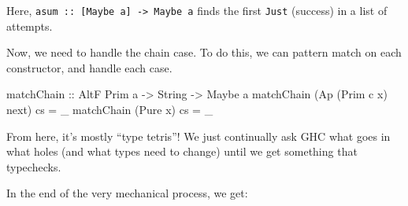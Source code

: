 \documentclass[]{article}
\newenvironment{Shaded}{}{}
\newcommand{\CommentTok}[1]{\textcolor[rgb]{0.38,0.63,0.69}{\textit{#1}}}
\newcommand{\DataTypeTok}[1]{\textcolor[rgb]{0.56,0.13,0.00}{#1}}
\newcommand{\FunctionTok}[1]{\textcolor[rgb]{0.02,0.16,0.49}{#1}}
\newcommand{\KeywordTok}[1]{\textcolor[rgb]{0.00,0.44,0.13}{\textbf{#1}}}
\newcommand{\NormalTok}[1]{#1}
\newcommand{\OtherTok}[1]{\textcolor[rgb]{0.00,0.44,0.13}{#1}}
\begin{document}
Here, \texttt{asum\ ::\ {[}Maybe\ a{]}\ -\textgreater{}\ Maybe\ a} finds the
first \texttt{Just} (success) in a list of attempts.

Now, we need to handle the chain case. To do this, we can pattern match on each
constructor, and handle each case.

\begin{Shaded}
\begin{Highlighting}[]
\OtherTok{matchChain ::} \DataTypeTok{AltF} \DataTypeTok{Prim}\NormalTok{ a }\OtherTok{->} \DataTypeTok{String} \OtherTok{->} \DataTypeTok{Maybe}\NormalTok{ a}
\NormalTok{matchChain (}\DataTypeTok{Ap}\NormalTok{ (}\DataTypeTok{Prim}\NormalTok{ c x) next) cs }\FunctionTok{=}\NormalTok{ _}
\NormalTok{matchChain (}\DataTypeTok{Pure}\NormalTok{ x)             cs }\FunctionTok{=}\NormalTok{ _}
\end{Highlighting}
\end{Shaded}

From here, it's mostly ``type tetris''! We just continually ask GHC what goes in
what holes (and what types need to change) until we get something that
typechecks.

In the end of the very mechanical process, we get:

\begin{Shaded}
\end{Shaded}
\end{document}
